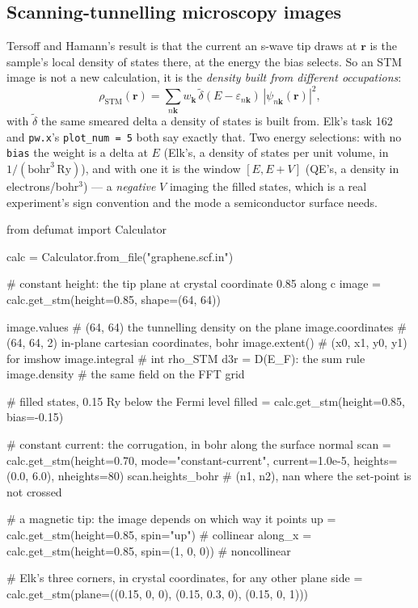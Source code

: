 \documentclass[11pt,a4paper]{article}
\newcommand{\code}[1]{\texttt{\small #1}}
\begin{document}
\subsection{Scanning-tunnelling microscopy images}

Tersoff and Hamann's result is that the current an s-wave tip draws at
$\mathbf r$ is the sample's local density of states there, at the energy the
bias selects. So an STM image is not a new calculation, it is the
\emph{density built from different occupations}:
\begin{equation*}
  \rho_{\mathrm{STM}}(\mathbf r)
   = \sum_{n\mathbf k} w_{\mathbf k}\,
     \tilde\delta(E - \varepsilon_{n\mathbf k})\,
     |\psi_{n\mathbf k}(\mathbf r)|^2 ,
\end{equation*}
with $\tilde\delta$ the same smeared delta a density of states is built from.
Elk's task 162 and \code{pw.x}'s \code{plot\_num = 5} both say exactly that.
Two energy selections: with no \code{bias} the weight is a delta at $E$ (Elk's,
a density of states per unit volume, in $1/(\mathrm{bohr}^3\,\mathrm{Ry})$),
and with one it is the window $[E, E+V]$ (QE's, a density in
electrons/bohr$^3$) --- a \emph{negative} $V$ imaging the filled states, which
is a real experiment's sign convention and the mode a semiconductor surface
needs.

\begin{pycode}
from defumat import Calculator

calc = Calculator.from_file("graphene.scf.in")

# constant height: the tip plane at crystal coordinate 0.85 along c
image = calc.get_stm(height=0.85, shape=(64, 64))

image.values        # (64, 64) the tunnelling density on the plane
image.coordinates   # (64, 64, 2) in-plane cartesian coordinates, bohr
image.extent()      # (x0, x1, y0, y1) for imshow
image.integral      # int rho_STM d3r = D(E_F): the sum rule
image.density       # the same field on the FFT grid

# filled states, 0.15 Ry below the Fermi level
filled = calc.get_stm(height=0.85, bias=-0.15)

# constant current: the corrugation, in bohr along the surface normal
scan = calc.get_stm(height=0.70, mode="constant-current",
                    current=1.0e-5, heights=(0.0, 6.0), nheights=80)
scan.heights_bohr   # (n1, n2), nan where the set-point is not crossed

# a magnetic tip: the image depends on which way it points
up = calc.get_stm(height=0.85, spin="up")            # collinear
along_x = calc.get_stm(height=0.85, spin=(1, 0, 0))  # noncollinear

# Elk's three corners, in crystal coordinates, for any other plane
side = calc.get_stm(plane=((0.15, 0, 0), (0.15, 0.3, 0), (0.15, 0, 1)))
\end{pycode}
\end{document}
